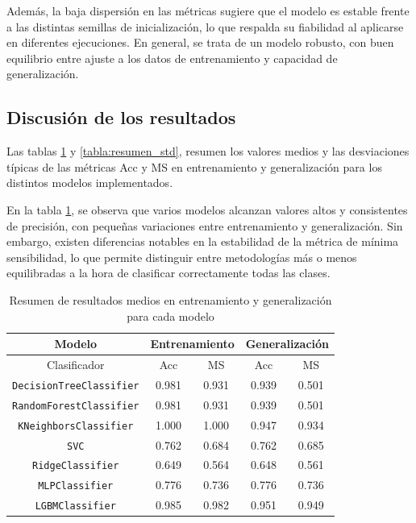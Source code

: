 \newpage
Además, la baja dispersión en las métricas sugiere que el modelo es estable frente a las distintas semillas de inicialización, lo que respalda su fiabilidad al aplicarse en diferentes ejecuciones. En general, se trata de un modelo robusto, con buen equilibrio entre ajuste a los datos de entrenamiento y capacidad de generalización.

\subsection{Discusión de los resultados}
\label{subsec:discusion}

Las tablas \ref{tabla:resumen_modelos} y \ref{tabla:resumen_std}, resumen los valores medios y las desviaciones típicas de las métricas Acc y MS en entrenamiento y generalización para los distintos modelos implementados.

En la tabla \ref{tabla:resumen_modelos}, se observa que varios modelos alcanzan valores altos y consistentes de precisión, con pequeñas variaciones entre entrenamiento y generalización. Sin embargo, existen diferencias notables en la estabilidad de la métrica de mínima sensibilidad, lo que permite distinguir entre metodologías más o menos equilibradas a la hora de clasificar correctamente todas las clases.

\begin{table}[H]
	\centering
	\begin{tabular}{|c|c|c|c|c|}
		\hline
		\rowcolor{LightCyan}
		Modelo & \multicolumn{2}{c|}{Entrenamiento} & \multicolumn{2}{c|}{Generalización} \\
		\hline
		\rowcolor{LightCyan}
		Clasificador & Acc & MS & Acc & MS \\
		\hline
		\texttt{DecisionTreeClassifier} & 0.981 & 0.931 & 0.939 & 0.501 \\
		\texttt{RandomForestClassifier} & 0.981 & 0.931 & 0.939 & 0.501 \\
		\texttt{KNeighborsClassifier}   & 1.000 & 1.000 & 0.947 & 0.934 \\
		\texttt{SVC}                    & 0.762 & 0.684 & 0.762 & 0.685 \\
		\texttt{RidgeClassifier}        & 0.649 & 0.564 & 0.648 & 0.561 \\
		\texttt{MLPClassifier}          & 0.776 & 0.736 & 0.776 & 0.736 \\
		\texttt{LGBMClassifier}         & 0.985 & 0.982 & 0.951 & 0.949 \\
		\hline
	\end{tabular}
	\caption{Resumen de resultados medios en entrenamiento y generalización para cada modelo}
	\label{tabla:resumen_modelos}
\end{table}

